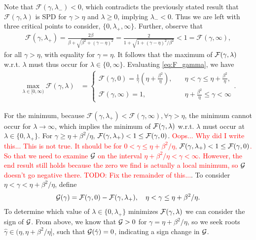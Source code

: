 \documentclass[a4paper,10pt]{article}
\newcommand{\tcr}{\textcolor{red}}
\begin{document}
Note that $\mathcal{F}(\gamma,\lambda_-) < 0$, which contradicts the previously
stated result that $\mathcal{F}(\gamma,\lambda)$ is SPD for $\gamma > \eta$
and $\lambda\geq 0$, implying $\lambda_- < 0$.
Thus we are left with three critical points to consider, 
$\{0,\lambda_+,\infty\}$. Further, observe that
%
\begin{align*}
\mathcal{F}(\gamma,\lambda_+) = \frac{2\beta}{\beta + \sqrt{\beta^2 + (\gamma-\eta)^2}}
	= \frac{2}{1 + \sqrt{1 + (\gamma-\eta)^2/\beta^2}} < 1 = \mathcal{F}(\gamma,\infty),
\end{align*}
%
for all $\gamma > \eta$, with equality for $\gamma = \eta$.
It follows that the maximum of ${\cal F}(\gamma,\lambda)$ w.r.t.
$\lambda$ must thus occur for $\lambda \in \{ 0, \infty \}$. Evaluating
\eqref{eq:F_gamma}, we have
%
\begin{align*}
\max_{\lambda\in[0,\infty)} \mathcal{F}(\gamma,\lambda) & = 
\begin{cases}
\displaystyle
\mathcal{F}(\gamma,0) 
= 
\frac{1}{\gamma} \left(\eta + \frac{\beta^2}{\eta} \right), 
\quad 
& \eta < \gamma \leq \eta +  \tfrac{\beta^2}{\eta}, \\
\displaystyle
\mathcal{F}(\gamma,\infty) 
= 
1, \quad & \eta + \tfrac{\beta^2}{\eta} \leq \gamma < \infty
\end{cases}.
\end{align*}
%

For the minimum, because $\mathcal{F}(\gamma,\lambda_+) < \mathcal{F}(\gamma,\infty),
\forall \gamma > \eta$, the minimum cannot occur for $\lambda \to \infty$, which
implies the minimum of ${\cal F}(\gamma,\lambda)$ w.r.t. $\lambda$ must occur
at $\lambda \in \{0, \lambda_+\}$. For $\gamma \geq \eta + \beta^2 / \eta$,
${\cal F}(\gamma, \lambda_+) < 1 \leq {\cal F}(\gamma, 0)$. \tcr{Oops... Why did I write this... This is not true. It should be for $0 < \gamma \leq \eta + \beta^2 / \eta$,
${\cal F}(\gamma, \lambda_+) < 1 \leq {\cal F}(\gamma, 0)$. So that we need to examine ${\cal G}$ on the interval $\eta + \beta^2/\eta < \gamma < \infty$.  However, the end result still holds because the zero we find is actually a local minimum, so ${\cal G}$ doesn't go negative there. TODO: Fix the remainder of this...}. To consider
$\eta < \gamma < \eta + \beta^2 / \eta$, define
%
\begin{align*}
{\cal G}(\gamma) = \mathcal{F}(\gamma,0) -  \mathcal{F}(\gamma,\lambda_+),
	\quad \eta < \gamma \leq \eta + \beta^2 / \eta.
\end{align*}
%
To determine which value of ${\lambda} \in \{0, \lambda_+ \}$ minimizes
${\cal F}(\gamma, \lambda)$ we can consider the sign of ${\cal G}$. From
above, we know that ${\cal G} > 0$ for $\gamma = \eta + \beta^2/\eta$, so
we seek roots $\hat{\gamma}\in(\eta,\eta+\beta^2/\eta]$, such that
${\cal G}(\hat{\gamma}) = 0$, indicating a sign change in ${\cal G}$.
\end{document}
